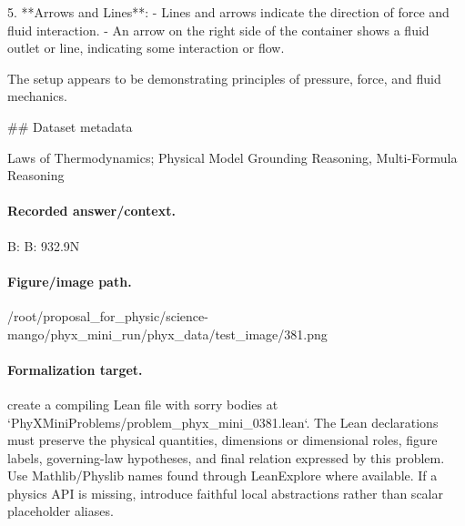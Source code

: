 5. **Arrows and Lines**:
   - Lines and arrows indicate the direction of force and fluid interaction.
   - An arrow on the right side of the container shows a fluid outlet or line, indicating some interaction or flow.

The setup appears to be demonstrating principles of pressure, force, and fluid mechanics.

\#\# Dataset metadata

Laws of Thermodynamics; Physical Model Grounding Reasoning, Multi-Formula Reasoning

\paragraph{Recorded answer/context.}
B: B: 932.9N

\paragraph{Figure/image path.}
/root/proposal\_for\_physic/science-mango/phyx\_mini\_run/phyx\_data/test\_image/381.png

\paragraph{Formalization target.}
create a compiling Lean file with sorry bodies at `PhyXMiniProblems/problem\_phyx\_mini\_0381.lean`. The Lean declarations must preserve the physical quantities, dimensions or dimensional roles, figure labels, governing-law hypotheses, and final relation expressed by this problem.
Use Mathlib/Physlib names found through LeanExplore where available. If a physics API is missing, introduce faithful local abstractions rather than scalar placeholder aliases.


